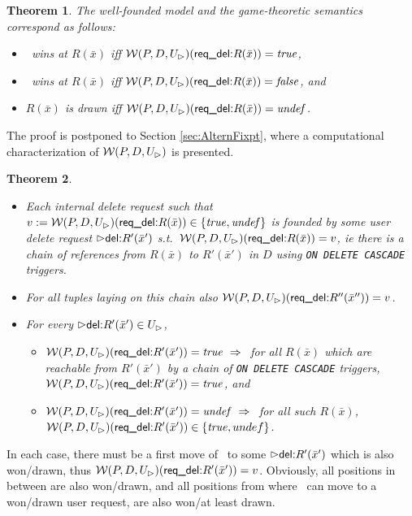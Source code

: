 \documentclass[twoside,11pt]{article}
\newtheorem{Theorem}{Theorem}
\theoremstyle{plain}
\def\rdel{\itorsf{req\_del:}}
\begin{document}
\begin{Theorem}\label{WinWFS}
The well-founded model and the game-theoretic semantics correspond as
follows:
  \begin{itemize}
  \item \I\ wins at $R(\bar x)$ iff
     $\pl W(P,D,U_\rhd)(\rdel R(\bar x)) = \true $,
  \item \II\ wins at $R(\bar x)$ iff
     $\pl W(P,D,U_\rhd)(\rdel R(\bar x)) = \false$, and
  \item $R(\bar x)$ is drawn iff
     $\pl W(P,D,U_\rhd) (\rdel R(\bar x)) = \undef$.
  \end{itemize}
\end{Theorem}
The proof is postponed to Section \ref{sec:AlternFixpt}, where a
computational characterization of $\mathcal W(P,D,U_\rhd)$ is presented.

\begin{Theorem}\label{theo:founded}
\begin{itemize}
\item
  Each internal delete request such that
  $v := \pl W(P,D,U_\rhd)(\rdel R(\bar x)) \in \{\true, \undef\}$ is
  \emph{founded} by some user delete request $\extev \del R'(\bar x')$
  s.t.\ $\pl W(P,D,U_\rhd)(\rdel R(\bar x)) = v$, ie there is a chain of
  references from $R(\bar x)$ to $R'(\bar x')$ in $D$ using
  \texttt{ON DELETE CASCADE} triggers.
\item For all tuples laying on this chain also
  $\pl W(P,D,U_\rhd)(\rdel R''(\bar x'')) = v$.
\item For every $\extev \del R'(\bar x') \in U_\rhd$,
  \begin{itemize}
  \item $\pl W(P,D,U_\rhd)(\rdel R'(\bar x')) = \true \Imp$
    for all $R(\bar x)$ which are reachable from $R'(\bar x')$ by a
    chain of \texttt{ON DELETE CASCADE} triggers,
    $\pl W(P,D,U_\rhd)(\rdel R'(\bar x')) = \true$, and
  \item $\pl W(P,D,U_\rhd)(\rdel R'(\bar x')) = \undef \Imp$
    for all such $R(\bar x)$,
    $\pl W(P,D,U_\rhd)(\rdel R'(\bar x')) \in \{\true,undef\}$.
  \end{itemize}
\end{itemize}
\end{Theorem}
\begin{Definition}
In each case, there must be a first move of \I\ to some
$\extev \del R'(\bar x')$ which is also won/drawn, thus
$\pl W(P,D,U_\rhd)(\rdel R'(\bar x')) = v$. 
Obviously, all positions in between are also won/drawn, and
all positions from where \I\ can move to a won/drawn user request,
are also won/at least drawn.
\end{Definition}
\end{document}
